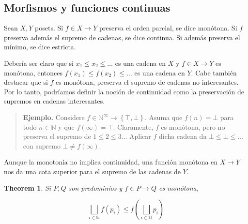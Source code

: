 \documentclass[article, 12pt]{article}
\newtheorem{theorem}{Theorem}
\newtheorem{theorem}{Theorem}
\begin{document}
\subsection{Morfismos y funciones continuas}

Sean $X, Y$ posets. Si $f \in X \to Y$ preserva el orden parcial, se dice
monótona. Si $f$ preserva además el supremo de cadenas, se dice continua. Si
además preserva el mínimo, se dice estricta.

Debería ser claro que si $x_1 \leq x_2 \leq \ldots$ es una cadena en $X$ y $f
\in X \to Y$ es monótona, entonces $f(x_1) \leq f(x_2) \leq \ldots$ es una
cadena en $Y$. Cabe también destacar que si $f$ es monótona, preserva el supremo
de cadenas no-interesantes. Por lo tanto, podríamos definir la noción de
continuidad como la preservación de supremos en cadenas interesantes.


\small
\begin{quote}

  \textbf{Ejemplo.} Considere $f \in \mathbb{N}^\infty \to \left\{ \top, \bot
  \right\} $. Asuma que $f(n) = \bot $ para todo $n \in \mathbb{N}$ y que
  $f(\infty) = \top$. Claramente, $f$ es monótona, pero no preserva el supremo
  de $1 \leq 2 \leq 3\ldots$ Aplicar $f$ dicha cadena da $\bot  \leq \bot  \leq
  \ldots$ con supremo $\bot \neq f(\infty)$.

\end{quote}
\normalsize

Aunque la monotonía no implica continuidad, una función monótona en $X \to Y$ nos da una cota
superior para el supremo de las cadenas de $Y$.

\begin{theorem}
  Si $P, Q$ son predominios y $f \in P \to Q$ es monótona, 

  \begin{equation*}
    \bigsqcup_{i \in \mathbb{N}} f(p_i) \leq f \left( \bigsqcup_{i \in
    \mathbb{N}} p_i \right) 
  \end{equation*}
\end{theorem}
\end{document}
